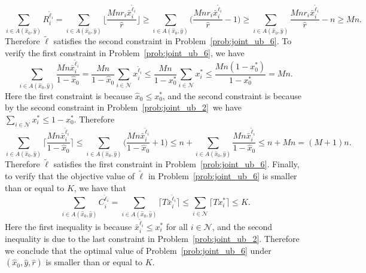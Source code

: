 \documentclass[mnsc,non-blindrev]{informs3}
\theoremstyle{definition}
\begin{document}
\begin{appendices}{\Large{}}
{\begin{equation*}
\sum_{i\in A(\hat{x}_0,\hat{y})}R_i^{\tilde{\ell}_i}=\sum_{i\in A(\hat{x}_0,\hat{y})}\Big\lfloor\dfrac{Mnr_i\bar{x}_i^{\tilde{\ell}_i}}{\hat{r}}\Big\rfloor\geq \sum_{i\in A(\hat{x}_0,\hat{y})}\Big(\dfrac{Mnr_i\bar{x}_i^{\tilde{\ell}_i}}{\hat{r}}-1\Big)\geq \sum_{i\in A(\hat{x}_0,\hat{y})}\dfrac{Mnr_i\bar{x}_i^{\tilde{\ell}_i}}{\hat{r}}-n\geq Mn.
\end{equation*}
Therefore $\tilde{\bm{\ell}}$ satisfies the second constraint in Problem~\eqref{prob:joint_ub_6}. To verify the first constraint in Problem~\eqref{prob:joint_ub_6}, we have
\begin{equation*}
\sum_{i\in A(\hat{x}_0,\hat{y})}\dfrac{Mn\bar{x}_i^{\tilde{\ell}_i}}{1-\hat{x}_0}=\dfrac{Mn}{1-\hat{x}_0}\sum_{i\in \mathcal{N}}x_i^{\tilde{\ell}_i}\leq \dfrac{Mn}{1-x_0^*}\sum_{i\in\mathcal{N}}x_i^*\leq \dfrac{Mn(1-x_0^*)}{1-x_0^*}=Mn.
\end{equation*}
Here the first constraint is because $\hat{x}_0\leq x_0^*$, and the second constraint is because by the second constraint in Problem~\eqref{prob:joint_ub_2}~we have $\sum_{i\in\mathcal{N}}x_i^*\leq 1-x_0^*$. Therefore
\begin{equation*}
\sum_{i\in A(\hat{x}_0,\hat{y})}\Big\lceil\dfrac{Mn\bar{x}_i^{\tilde{\ell}_i}}{1-\hat{x}_0}\Big\rceil\leq \sum_{i\in A(\hat{x}_0,\hat{y})}\Big(\dfrac{Mn\bar{x}_i^{\tilde{\ell}_i}}{1-\hat{x}_0}+1\Big)\leq n+\sum_{i\in A(\hat{x}_0,\hat{y})}\dfrac{Mn\bar{x}_i^{\tilde{\ell}_i}}{1-\hat{x}_0}\leq n+Mn=(M+1)n.
\end{equation*}
Therefore $\tilde{\bm{\ell}}$ satisfies the first constraint in Problem~\eqref{prob:joint_ub_6}. Finally, to verify that the objective value of $\tilde{\bm{\ell}}$ in Problem~\eqref{prob:joint_ub_6} is smaller than or equal to $K$, we have that
\begin{equation*}
\sum_{i\in A(\hat{x}_0,\hat{y})} C_i^{\tilde{\ell}_i}=\sum_{i\in A(\hat{x}_0,\hat{y})}\lceil T\bar{x}_i^{\tilde{\ell}_i}\rceil\leq \sum_{i\in \mathcal{N}} \lceil Tx_i^*\rceil\leq K.
\end{equation*}
Here the first inequality is because $\bar{x}_i^{\tilde{\ell}_i}\leq x_i^*$ for all $i\in\mathcal{N}$, and the second inequality is due to the last constraint in Problem~\eqref{prob:joint_ub_2}. Therefore we conclude that the optimal value of Problem~\eqref{prob:joint_ub_6} under $(\hat{x}_0,\hat{y},\hat{r})$ is smaller than or equal to $K$.

}
\end{appendices}
\end{document}
